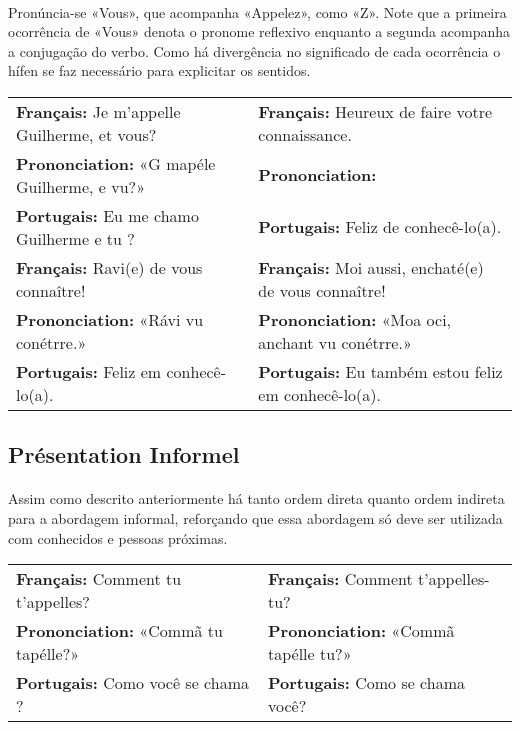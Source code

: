\documentclass{article}
\begin{document}
        \paragraph{}Pronúncia-se «Vous», que acompanha «Appelez», como «Z». Note que a primeira ocorrência de «Vous» denota o pronome reflexivo enquanto a segunda acompanha a conjugação do verbo. Como há divergência no significado de cada ocorrência o hífen se faz necessário para explicitar os sentidos.

            \begin{center}
                \begin{tabular}{m{8cm} m{8cm}}
                    \textbf{Français:}      Je m’appelle Guilherme, et vous? & \textbf{Français:}      Heureux de faire votre connaissance.\\
                    \textbf{Prononciation:} «G mapéle Guilherme, e vu?»     & \textbf{Prononciation:}\\
                    \textbf{Portugais:}     Eu me chamo Guilherme e tu ?     & \textbf{Portugais:}     Feliz de conhecê-lo(a).\\[2.5ex]
                    
                    \textbf{Français:}      Ravi(e) de vous connaître! & \textbf{Français:}      Moi aussi, enchaté(e) de vous connaître!\\
                    \textbf{Prononciation:} «Rávi vu conétrre.»        & \textbf{Prononciation:} «Moa oci, anchant vu conétrre.»\\
                    \textbf{Portugais:}     Feliz em conhecê-lo(a).    & \textbf{Portugais:}     Eu também estou feliz em conhecê-lo(a).\\
                \end{tabular}
            \end{center}
    
    \subsection{Présentation Informel}
        \paragraph{}Assim como descrito anteriormente há tanto ordem direta quanto ordem indireta para a abordagem informal, reforçando que essa abordagem só deve ser utilizada com conhecidos e pessoas próximas.
        
            \begin{center}
                \begin{tabular}{m{8cm} m{8cm}}
                    \textbf{Français:}      Comment tu t’appelles? & \textbf{Français:}      Comment t’appelles-tu?\\
                    \textbf{Prononciation:} «Commã tu tapélle?»    & \textbf{Prononciation:} «Commã tapélle tu?»\\
                    \textbf{Portugais:}     Como você se chama ?   & \textbf{Portugais:}     Como se chama você?\\
                \end{tabular}
            \end{center}
    
\end{document}
